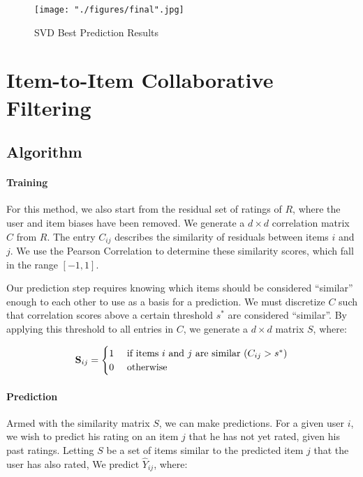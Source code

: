 \documentclass[12pt]{article}
\begin{document}
\begin{figure}[!ht]
\begin{center}
\caption{SVD Best Prediction Results}
    \texttt{[image: "./figures/final".jpg]}
\end{center}
\end{figure}

\section{Item-to-Item Collaborative Filtering}

\subsection*{Algorithm}
\paragraph{Training} For this method, we also start from the residual set of ratings of $R$, where the user and item biases have been removed. We generate a $d \times d$ correlation matrix $C$ from $R$. The entry ${C}_{ij}$ describes the similarity of residuals between items $i$ and $j$. We use the Pearson Correlation to determine these similarity scores, which fall in the range $[-1, 1]$.


Our prediction step requires knowing which items should be considered ``similar'' enough to each other to use as a basis for a prediction. We must discretize ${C}$ such that correlation scores above a certain threshold $s^*$ are considered ``similar''.\textsuperscript{\cite{sarwar}} By applying this threshold to all entries in ${C}$, we generate a $d \times d$ matrix ${S}$, where:

$$
\mathbf{S}_{ij} =
\begin{cases}
    \hfill 1    \hfill & \text{ if items $i$ and $j$ are similar ($C_{ij} > s^*$)} \\
    \hfill 0    \hfill & \text{ otherwise} \\
\end{cases}
$$

\paragraph{Prediction} Armed with the similarity matrix ${S}$, we can make predictions. For a given user $i$, we wish to predict his rating on an item $j$ that he has not yet rated, given his past ratings. Letting $S$ be a set of items similar to the predicted item $j$ that the user has also rated, We predict $\hat Y_{ij}$, where:
\end{document}
